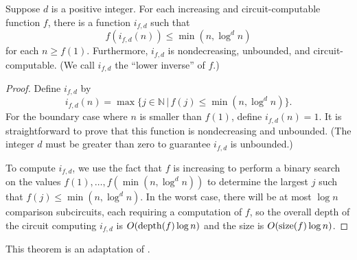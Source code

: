 \begin{lemma}\label{lem:lowerinverse}
  Suppose $d$ is a positive integer.
  For each increasing and circuit-computable function $f$, there is a function $i_{f, d}$ such that
  \[
  f(i_{f, d}(n)) \leq \min(n, \log^d n)
  \]
  for each $n \geq f(1)$.
  Furthermore, $i_{f, d}$ is nondecreasing, unbounded, and circuit-computable.
  (We call $i_{f, d}$ the ``lower inverse'' of $f$.)
\end{lemma}
\begin{proof}
  Define $i_{f, d}$ by
  \[
  i_{f, d}(n) = \max\{ j \in \mathbb{N} \, | \, f(j) \leq \min(n, \log^d n) \}.
  \]
  For the boundary case where $n$ is smaller than $f(1)$, define $i_{f, d}(n) = 1$.
  It is straightforward to prove that this function is nondecreasing and unbounded.
  (The integer $d$ must be greater than zero to guarantee $i_{f, d}$ is unbounded.)

  To compute $i_{f, d}$, we use the fact that $f$ is increasing to perform a binary search on the values $f(1), \dotsc, f(\min(n, \log^d n))$ to determine the largest $j$ such that $f(j) \leq \min(n, \log^d n)$.
  In the worst case, there will be at most $\log n$ comparison subcircuits, each requiring a computation of $f$, so the overall depth of the circuit computing $i_{f, d}$ is $O(\operatorname{depth}(f) \log n)$ and the size is $O(\operatorname{size}(f) \log n)$.
\end{proof}

This theorem is an adaptation of \autocite[Theorem~3.29]{fg06}.

